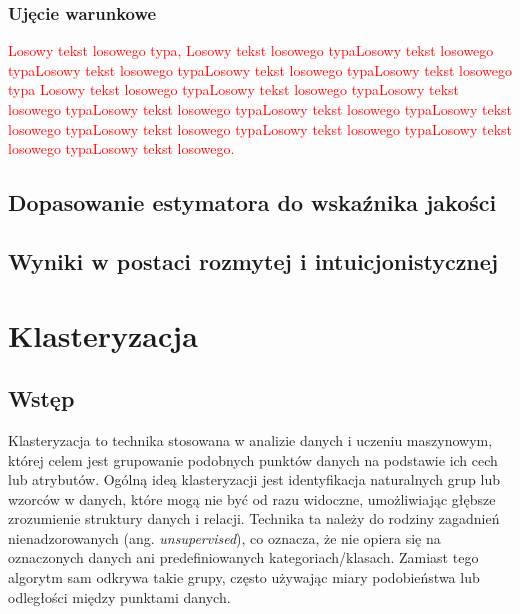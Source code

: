 \documentclass[12pt,a4paper,oneside]{book}
\theoremstyle{definition}
\begin{document}
\subsection*{Ujęcie warunkowe}

\textcolor{red}{Losowy tekst losowego typa, Losowy tekst losowego typaLosowy tekst losowego typaLosowy tekst losowego typaLosowy tekst losowego typaLosowy tekst losowego typa Losowy tekst losowego typaLosowy tekst losowego typaLosowy tekst losowego typaLosowy tekst losowego typaLosowy tekst losowego typaLosowy tekst losowego typaLosowy tekst losowego typaLosowy tekst losowego typaLosowy tekst losowego typaLosowy tekst losowego.}

\section{Dopasowanie estymatora do wskaźnika jakości}

\section{Wyniki w postaci rozmytej i intuicjonistycznej}

\chapter{Klasteryzacja} \label{chap:clustering}

\section{Wstęp}

Klasteryzacja to technika stosowana w analizie danych i uczeniu maszynowym, której celem jest grupowanie podobnych punktów danych na podstawie ich cech lub atrybutów. Ogólną ideą klasteryzacji jest identyfikacja naturalnych grup lub wzorców w danych, które mogą nie być od razu widoczne, umożliwiając głębsze zrozumienie struktury danych i relacji. Technika ta należy do rodziny zagadnień nienadzorowanych (ang. \textit{unsupervised}), co oznacza, że nie opiera się na oznaczonych danych ani predefiniowanych kategoriach/klasach. Zamiast tego algorytm sam odkrywa takie grupy, często używając miary podobieństwa lub odległości między punktami danych.
\end{document}
